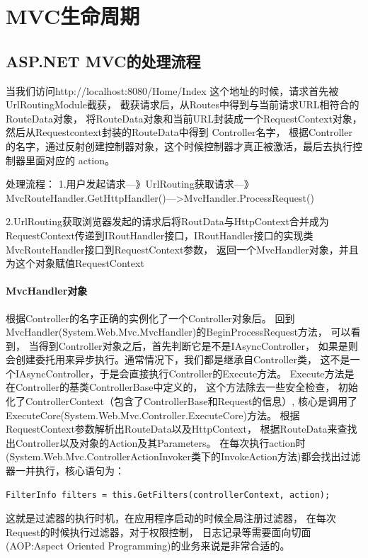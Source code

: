 \documentclass{book}
\begin{document}
\section{MVC生命周期}

\subsection{ASP.NET MVC的处理流程}

当我们访问http://localhost:8080/Home/Index 这个地址的时候，请求首先被UrlRoutingModule截获，
截获请求后，从Routes中得到与当前请求URL相符合的RouteData对象， 
将RouteData对象和当前URL封装成一个RequestContext对象，然后从Requestcontext封装的RouteData中得到 Controller名字，
根据Controller的名字，通过反射创建控制器对象，这个时候控制器才真正被激活，最后去执行控制器里面对应的 action。

处理流程：
1.用户发起请求---》UrlRouting获取请求—》MvcRouteHandler.GetHttpHandler()—>MvcHandler.ProcessRequest()

2.UrlRouting获取浏览器发起的请求后将RoutData与HttpContext合并成为RequestContext传递到IRoutHandler接口，IRoutHandler接口的实现类MvcRouteHandler接口到RequestContext参数，
返回一个MvcHandler对象，并且为这个对象赋值RequestContext

\paragraph{MvcHandler对象}
根据Controller的名字正确的实例化了一个Controller对象后。
回到MvcHandler(System.Web.Mvc.MvcHandler)的BeginProcessRequest方法，
可以看到，
当得到Controller对象之后，首先判断它是不是IAsyncController，
如果是则会创建委托用来异步执行。通常情况下，我们都是继承自Controller类，
这不是一个IAsyncController，于是会直接执行Controller的Execute方法。
Execute方法是在Controller的基类ControllerBase中定义的，
这个方法除去一些安全检查，
初始化了ControllerContext（包含了ControllerBase和Request的信息）,
核心是调用了ExecuteCore(System.Web.Mvc.Controller.ExecuteCore)方法。
根据RequestContext参数解析出RouteData以及HttpContext，
根据RouteData来查找出Controller以及对象的Action及其Parameters。
在每次执行action时(System.Web.Mvc.ControllerActionInvoker类下的InvokeAction方法)都会找出过滤器一并执行，核心语句为：

\begin{lstlisting}[language={[Sharp]C}]
FilterInfo filters = this.GetFilters(controllerContext, action);
\end{lstlisting}

这就是过滤器的执行时机，在应用程序启动的时候全局注册过滤器，
在每次Request的时候执行过滤器，对于权限控制，
日志记录等需要面向切面(AOP:Aspect Oriented Programming)的业务来说是非常合适的。
\end{document}
